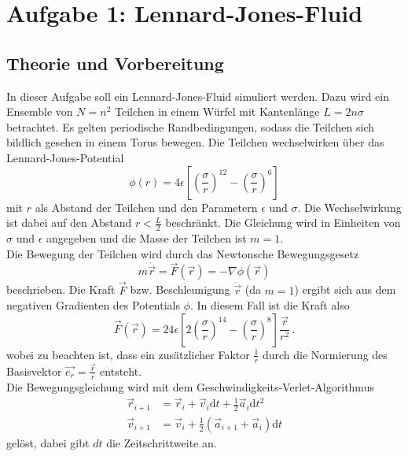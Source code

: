 \section{Aufgabe 1: Lennard-Jones-Fluid}

\subsection{Theorie und Vorbereitung}
In dieser Aufgabe soll ein Lennard-Jones-Fluid simuliert werden.
Dazu wird ein Ensemble von $N=n^2$ Teilchen in einem Würfel mit Kantenlänge $L=2 n \sigma$ betrachtet.
Es gelten periodische Randbedingungen, sodass die Teilchen sich bildlich gesehen in einem Torus bewegen.
Die Teilchen wechselwirken über das Lennard-Jones-Potential
\begin{equation}
    \phi(r) = 4 \epsilon \left[ \left( \frac{\sigma}{r} \right)^{12} - \left( \frac{\sigma}{r} \right)^6 \right]
\end{equation}
mit $r$ als Abstand der Teilchen und den Parametern $\epsilon$ und $\sigma$.
Die Wechselwirkung ist dabei auf den Abstand $r < \frac{L}{2}$ beschränkt.
Die Gleichung wird in Einheiten von $\sigma$ und $\epsilon$ angegeben und die Masse der Teilchen ist $m=1$.
\\
Die Bewegung der Teilchen wird durch das Newtonsche Bewegungsgesetz
\begin{equation}
    m \ddot{\vec{r}} = \vec{F}(\vec{r}) = - \nabla \phi(\vec{r})
\end{equation}
beschrieben.
Die Kraft $\vec{F}$ bzw. Beschleunigung $\ddot{\vec{r}}$ (da $m=1$) ergibt sich aus dem negativen Gradienten des Potentials $\phi$.
In diesem Fall ist die Kraft also
\begin{equation}
    \vec{F}(\vec{r}) = 24 \epsilon \left[ 2 \left( \frac{\sigma}{r} \right)^{14} - \left( \frac{\sigma}{r} \right)^8 \right] \frac{\vec{r}}{r^2} \,.
\end{equation}
wobei zu beachten ist, dass ein zusätzlicher Faktor $\frac{1}{r}$ durch die Normierung des Basisvektor $\vec{e_r} = \frac{\vec{r}}{r}$ entsteht.
\\
Die Bewegungsgleichung wird mit dem Geschwindigkeits-Verlet-Algorithmus
\begin{align}
    \vec{r}_{i+1} &= \vec{r}_i + \vec{v}_i \mathrm{d}t + \frac{1}{2} \vec{a}_i \mathrm{d}t^2 \\
    \vec{v}_{i+1} &= \vec{v}_i + \frac{1}{2} \left( \vec{a}_{i+1} + \vec{a}_{i} \right) \mathrm{d}t
\end{align}
gelöst, dabei gibt $dt$ die Zeitschrittweite an.
